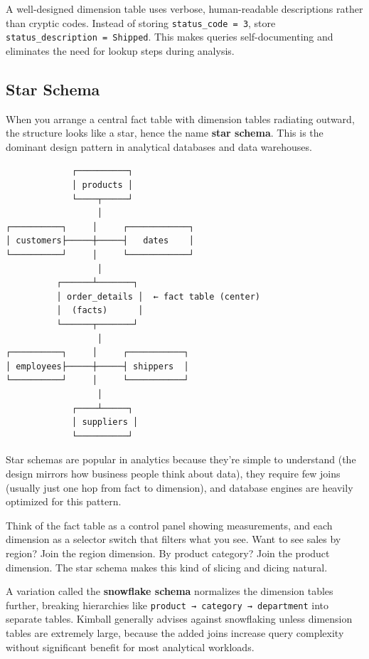 \documentclass[
  letterpaper,
  DIV=11,
  numbers=noendperiod]{scrreprt}
\begin{document}
A well-designed dimension table uses verbose, human-readable
descriptions rather than cryptic codes. Instead of storing
\texttt{status\_code\ =\ 3}, store
\texttt{status\_description\ =\ \textquotesingle{}Shipped\textquotesingle{}}.
This makes queries self-documenting and eliminates the need for lookup
steps during analysis.

\subsection{Star Schema}\label{star-schema}

When you arrange a central fact table with dimension tables radiating
outward, the structure looks like a star, hence the name \textbf{star
schema}. This is the dominant design pattern in analytical databases and
data warehouses.

\begin{verbatim}
             ┌──────────┐
             │ products │
             └────┬─────┘
                  │
┌──────────┐     │     ┌────────────┐
│ customers├─────┼─────┤   dates    │
└──────────┘     │     └────────────┘
                  │
          ┌──────┴───────┐
          │ order_details │  ← fact table (center)
          │  (facts)      │
          └──────┬───────┘
                  │
┌──────────┐     │     ┌───────────┐
│ employees├─────┼─────┤ shippers  │
└──────────┘     │     └───────────┘
                  │
             ┌────┴─────┐
             │ suppliers │
             └──────────┘
\end{verbatim}

Star schemas are popular in analytics because they're simple to
understand (the design mirrors how business people think about data),
they require few joins (usually just one hop from fact to dimension),
and database engines are heavily optimized for this pattern.

Think of the fact table as a control panel showing measurements, and
each dimension as a selector switch that filters what you see. Want to
see sales by region? Join the region dimension. By product category?
Join the product dimension. The star schema makes this kind of slicing
and dicing natural.

A variation called the \textbf{snowflake schema} normalizes the
dimension tables further, breaking hierarchies like
\texttt{product\ →\ category\ →\ department} into separate tables.
Kimball generally advises against snowflaking unless dimension tables
are extremely large, because the added joins increase query complexity
without significant benefit for most analytical workloads.
\end{document}
